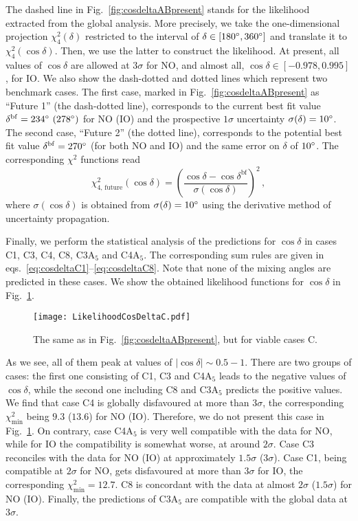 \documentclass[11pt,a4paper]{article}
\newcommand{\be}{\begin{equation}}
\newcommand{\ee}{\end{equation}}
\numberwithin{equation}{section}
\begin{document}
 The dashed line in Fig.~\ref{fig:cosdeltaABpresent} stands for the likelihood 
extracted from the global analysis. More precisely, we take the 
one-dimensional projection 
$\chi_4^2(\delta)$ restricted to the interval 
of $\delta\in[180\degree,360\degree]$ 
and translate it to $\chi_4^2(\cos\delta)$. Then, we use the latter 
to construct the likelihood.
At present, all values of $\cos\delta$ are allowed at $3\sigma$ for NO, 
and almost all, $\cos\delta\in[-0.978,0.995]$, for IO. 
We also show the dash-dotted and dotted lines which represent two benchmark cases. 
The first case, marked in Fig.~\ref{fig:cosdeltaABpresent} as ``Future 1'' 
(the dash-dotted line), corresponds to  
the current best fit value $\delta^\mathrm{bf} = 234\degree~(278\degree)$ for NO (IO) 
and the prospective $1\sigma$ uncertainty $\sigma(\delta) = 10\degree$.
The second case, ``Future 2'' (the dotted line), corresponds to 
the potential best fit value $\delta^\mathrm{bf} = 270\degree$ 
(for both NO and IO) 
and the same error on $\delta$ of $10\degree$. 
The corresponding $\chi^2$ functions read 
\be
\chi_\mathrm{4,\,future}^2\left(\cos\delta\right) = \left(
\frac{\cos\delta - \cos\delta^\mathrm{bf}}{\sigma(\cos\delta)}
\right)^2\,,
\ee
%
where $\sigma(\cos\delta)$ is obtained from $\sigma(\delta) = 10\degree$ 
using the derivative method of uncertainty propagation.

 Finally, we perform the statistical analysis of the predictions 
for $\cos\delta$ 
in cases C1, C3, C4, C8, C3A$_5$ and C4A$_5$. The corresponding sum rules are 
given in eqs.~\eqref{eq:cosdeltaC1}--\eqref{eq:cosdeltaC8}. 
Note that none of the mixing angles are predicted in these cases. 
We show the obtained likelihood functions for 
$\cos\delta$ in Fig.~\ref{fig:cosdeltaCpresent}.
\begin{figure}
\centering
\texttt{[image: LikelihoodCosDeltaC.pdf]}
\caption{The same as in Fig.~\ref{fig:cosdeltaABpresent}, but for viable cases C.}
\label{fig:cosdeltaCpresent}
\end{figure}
%
As we see, all of them peak at values of $|\cos\delta|\sim0.5-1$. 
There are two groups of cases: 
the first one consisting of C1, C3 and C4A$_5$ leads to the negative values of $\cos\delta$, 
while the second one including C8 and C3A$_5$ predicts the positive values. 
We find that case C4 is globally disfavoured at more than $3\sigma$, 
the corresponding $\chi^2_\mathrm{min}$ being $9.3$ ($13.6$) for NO (IO). 
Therefore, we do not present this case in Fig.~\ref{fig:cosdeltaCpresent}.
On contrary, case C4A$_5$ is very well compatible with the data for NO, 
while for IO the compatibility is somewhat worse, at around $2\sigma$. 
Case C3 reconciles with the data for NO (IO) 
at approximately $1.5\sigma$ ($3\sigma$).  
Case C1, being compatible at $2\sigma$ for NO, 
gets disfavoured at more than $3\sigma$ for IO, 
the corresponding $\chi^2_\mathrm{min} = 12.7$. 
C8 is concordant with the data at almost $2\sigma$ ($1.5\sigma$) for NO (IO).
Finally, the predictions of C3A$_5$ are compatible with 
the global data at $3\sigma$. 
\end{document}
